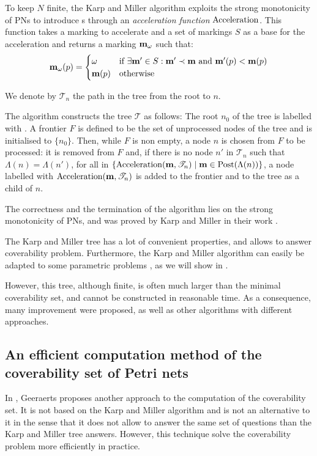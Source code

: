 To keep $N$ finite, the Karp and Miller algorithm exploits the strong monotonicity of \acp{PN} to introduce \omark{}s through an \emph{acceleration function} $\operatorname{Acceleration}$.
This function takes a marking \marq to accelerate and a set of markings $S$ as a base  for the acceleration and returns a marking $\mathbf{m}_\omega$ such that:
\[
  \mathbf{m}_\omega(p) =
  \begin{cases}
    \omega    &\text{if } \exists \mathbf{m'} \in S : \mathbf{m'} \prec \mathbf{m} \text{ and } \mathbf{m'}(p) < \mathbf{m}(p) \\
    \mathbf{m}(p)  &\text{otherwise}
  \end{cases}
\]

We denote by $\mathscr{T}_n$ the path in the tree from the root to $n$.

The algorithm constructs the tree $\mathcal{T}$ as follows:
The root $n_0$ of the tree is labelled with \marqi.
A frontier $F$ is defined to be the set of unprocessed nodes of the tree and is initialised to $\{n_0\}$.
Then, while $F$ is non empty, a node $n$ is chosen from $F$ to be processed:
it is removed from $F$ and, if there is no node $n'$ in $\mathscr{T}_n$ such that $\Lambda(n) = \Lambda(n')$, for all \omark in $\{\operatorname{Acceleration}(\mathbf{m}, \mathscr{T}_n) \mid \mathbf{m} \in \operatorname{Post}(\Lambda(n))\}$, a node labelled with $\operatorname{Acceleration}(\mathbf{m}, \mathscr{T}_n)$ is added to the frontier and to the tree as a child of $n$.

The correctness and the termination of the algorithm lies on the strong monotonicity of \acp{PN}, and was proved by Karp and Miller in their work \cite{Karp69}.

The Karp and Miller tree has a lot of convenient properties, and allows to answer coverability problem. 
Furthermore, the Karp and Miller algorithm can easily be adapted to some parametric problems \cite{David17}, as we will show in .

However, this tree, although finite, is often much larger than the minimal coverability set, and cannot be constructed in reasonable time.
As a consequence, many improvement were proposed, as well as other algorithms with different approaches.

\subsection{An efficient computation method of the coverability set of Petri nets}
\label{sec:eff}

In \cite{Geeraerts07thesis, Geeraerts07}, Geeraerts proposes another approach to the computation of the coverability set.
It is not based on the Karp and Miller algorithm and is not an alternative to it in the sense that it does not allow to answer the same set of questions than the Karp and Miller tree answers.
However, this technique solve the coverability problem more efficiently in practice.

